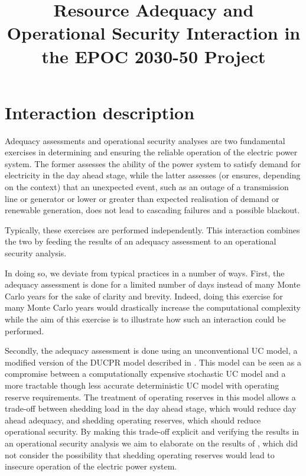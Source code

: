 \documentclass[number,times]{elsarticle}
\begin{document}
\title{Resource Adequacy and Operational Security Interaction in the EPOC 2030-50 Project}

\maketitle

\newpage

\tableofcontents



\newpage

\section{Interaction description}

Adequacy assessments and operational security analyses are two fundamental exercises in determining and ensuring the reliable operation of the electric power system. The former assesses the ability of the power system to satisfy demand for electricity in the day ahead stage, while the latter assesses (or ensures, depending on the context) that an unexpected event, such as an outage of a transmission line or generator or lower or greater than expected realisation of demand or renewable generation, does not lead to cascading failures and a possible blackout.

Typically, these exercises are performed independently. This interaction combines the two by feeding the results of an adequacy assessment to an operational security analysis.

In doing so, we deviate from typical practices in a number of ways. First, the adequacy assessment is done for a limited number of days instead of many Monte Carlo years for the sake of clarity and brevity. Indeed, doing this exercise for many Monte Carlo years would drastically increase the computational complexity while the aim of this exercise is to illustrate how such an interaction could be performed.

Secondly, the adequacy assessment is done using an unconventional \ac{UC} model, a modified version of the \ac{DUCPR} model described in \cite{Bruninx2017}. This model can be seen as a compromise between a computationally expensive stochastic \ac{UC} model and a more tractable though less accurate deterministic \ac{UC} model with operating reserve requirements. The treatment of operating reserves in this model allows a trade-off between shedding load in the day ahead stage, which would reduce day ahead adequacy, and shedding operating reserves, which should reduce operational security. By making this trade-off explicit and verifying the results in an operational security analysis we aim to elaborate on the results of \cite{Hermans2018}, which did not consider the possibility that shedding operating reserves would lead to insecure operation of the electric power system.
\end{document}
